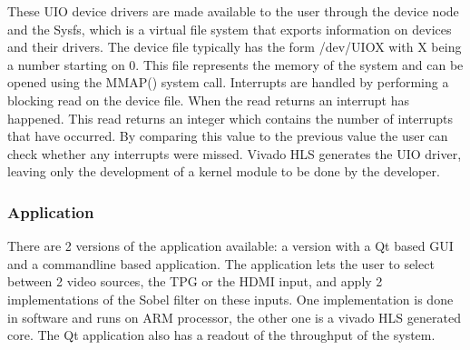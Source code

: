 These UIO device drivers are made available to the user through the device node and the Sysfs, which is a virtual file system that exports information on devices and their drivers. The device file typically has the form /dev/UIOX with X being a number starting on 0. This file represents the memory of the system and can be opened using the MMAP() system call. Interrupts are handled by performing a blocking read on the device file. When the read returns an interrupt has happened. This read returns an integer which contains the number of interrupts that have occurred. By comparing this value to the previous value the user can check whether any interrupts were missed. Vivado HLS generates the UIO driver, leaving only the development of a kernel module to be done by the developer.

\subsubsection{Application}
There are 2 versions of the application available: a version with a Qt based GUI and a commandline based application. The application lets the user to select between 2 video sources, the TPG or the HDMI input, and apply 2 implementations of the Sobel filter on these inputs. One implementation is done in software and runs on ARM processor, the other one is a vivado HLS generated core. The Qt application also has a readout of the throughput of the system.